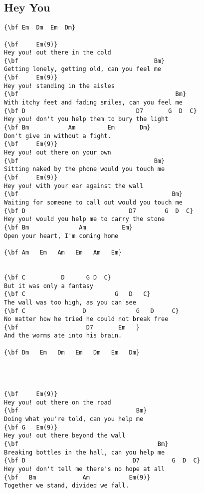 \documentclass[a4paper]{article}
\begin{document}
\subsection{Hey You} %
\label{sub:Hey You}
\begin{Verbatim}[commandchars=\\\{\}]
{\bf Em  Dm  Em  Dm}

{\bf     Em(9)}
Hey you! out there in the cold
{\bf                                      Bm}
Getting lonely, getting old, can you feel me
{\bf     Em(9)}
Hey you! standing in the aisles
{\bf                                            Bm}
With itchy feet and fading smiles, can you feel me
{\bf D                               D7       G  D  C}
Hey you! don't you help them to bury the light
{\bf Bm           Am         Em       Dm}
Don't give in without a fight.
{\bf     Em(9)}
Hey you! out there on your own
{\bf                                      Bm}
Sitting naked by the phone would you touch me
{\bf     Em(9)}
Hey you! with your ear against the wall
{\bf                                           Bm}
Waiting for someone to call out would you touch me
{\bf D                             D7        G  D  C}
Hey you! would you help me to carry the stone
{\bf Bm              Am          Em}
Open your heart, I'm coming home

{\bf Am   Em   Am   Em   Am   Em}


{\bf C          D      G D  C}
But it was only a fantasy
{\bf C                         G   D   C}
The wall was too high, as you can see
{\bf C                D              G   D     C}
No matter how he tried he could not break free
{\bf                   D7       Em   }
And the worms ate into his brain.

{\bf Dm   Em   Dm   Em   Dm   Em   Dm}




{\bf     Em(9)}
Hey you! out there on the road
{\bf                                 Bm}
Doing what you're told, can you help me
{\bf G   Em(9)}
Hey you! out there beyond the wall
{\bf                                       Bm}
Breaking bottles in the hall, can you help me
{\bf D                              D7         G  D  C}
Hey you! don't tell me there's no hope at all
{\bf   Bm             Am           Em(9)}
Together we stand, divided we fall.
\end{Verbatim}
\newpage
\end{document}
